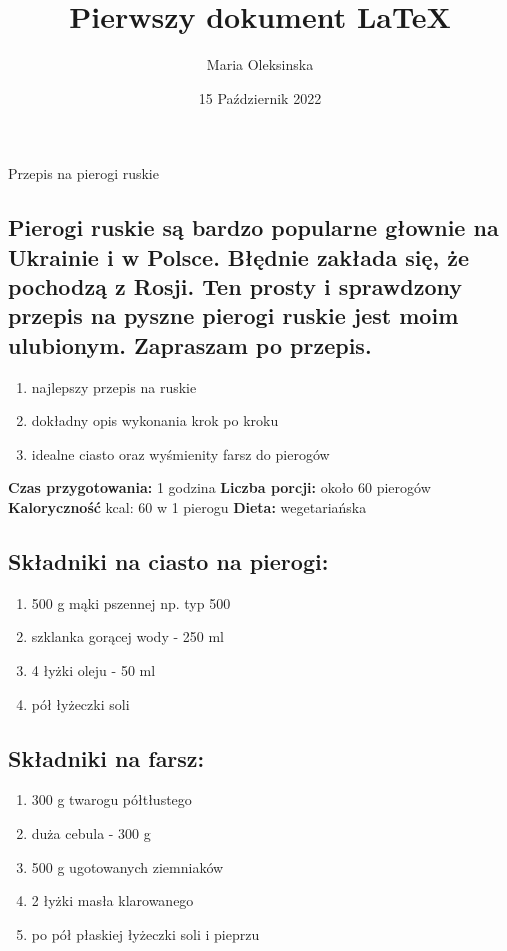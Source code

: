 \documentclass[12pt, letterpaper, titlepage]{article}
\title{Pierwszy dokument LaTeX}
\author{Maria Oleksinska}
\date{15 Październik 2022}
\begin{document}
\maketitle

 
 \begin{center}
 \huge {Przepis na pierogi ruskie}
 \end{center}
 
\subsection*{ Pierogi ruskie są bardzo popularne głownie na Ukrainie i w Polsce. Błędnie zakłada się, że pochodzą z Rosji. Ten prosty i sprawdzony przepis na pyszne pierogi ruskie jest moim ulubionym. Zapraszam po przepis. }

 
\begin{enumerate}
\item  najlepszy przepis na ruskie  
\item  dokładny opis wykonania krok po kroku 
\item  idealne ciasto oraz wyśmienity farsz do pierogów 
\end{enumerate}

\noindent\textbf{Czas przygotowania:} 1 godzina\newline
\textbf{Liczba porcji:} około 60 pierogów\newline
\textbf{Kaloryczność} kcal: 60 w 1 pierogu\newline
\textbf{Dieta:} wegetariańska

\subsection*{Składniki na ciasto na pierogi:}

\begin{enumerate}

\item 500 g mąki pszennej np. typ 500
\item szklanka gorącej wody - 250 ml
\item 4 łyżki oleju - 50 ml
\item pół łyżeczki soli

\end{enumerate}

\subsection*{Składniki na farsz:}

\begin{enumerate}

\item 300 g twarogu półtłustego
\item duża cebula - 300 g
\item 500 g ugotowanych ziemniaków
\item 2 łyżki masła klarowanego
\item po pół płaskiej łyżeczki soli i pieprzu

\end{enumerate}
\end{document}

